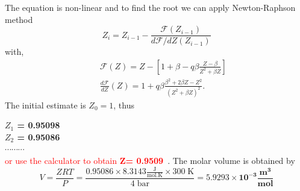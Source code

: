 \documentclass[calculator,steamtables,datasheet,solutions]{exam_newMarcus2}
\newcommand{\frc}{\displaystyle\frac}
\begin{document}
\begin{question}
\begin{enumerate}[(a)]
{The equation is non-linear and to find the root we can apply Newton-Raphson method 
\begin{displaymath}
Z_{i} = Z_{i-1} - \frc{\mathcal{F}\left(Z_{i-1}\right)}{d\mathcal{F}/dZ \left(Z_{i-1}\right)}
\end{displaymath}
with,
\begin{eqnarray}
&& \mathcal{F}\left(Z\right) = Z - \left[ 1 + \beta - q\beta\frc{Z-\beta}{Z^{2}+\beta Z}\right] \nonumber \\
&& \frc{d\mathcal{F}}{dZ}\left(Z\right) = 1 + q\beta \frc{\beta^{2}+2\beta Z- Z^{2}}{\left(Z^{2}+\beta Z\right)^{2}}. \nonumber
\end{eqnarray} 
The initial estimate is $Z_{0}=1$, thus
\begin{center}
{\bf $Z_{1}$ = 0.95098}~ \\
{\bf $Z_{2}$ = 0.95086}~ \\
$\cdots \cdots \cdots $ \\
\textcolor{red} {or use the calculator to obtain $\mathbf{Z}${\bf = 0.9509}}~\solmarks{\textcolor{red}{5/12}}. The molar volume is obtained by~ 
\begin{displaymath}
    V = \frc{Z R T}{P} = \frc{ 0.95086 \times 8.3143 \frc{\text{J}}{\text{mol.K}} \times 300\; \text{K}}{4\; \text{bar}} = \mathbf{5.9293\times 10^{-3}\frc{\text{m}^{3}}{\text{mol}}}
\end{displaymath}

\end{center}
} 
%
\end{enumerate}
%
\end{question}

\clearpage
\end{document}
